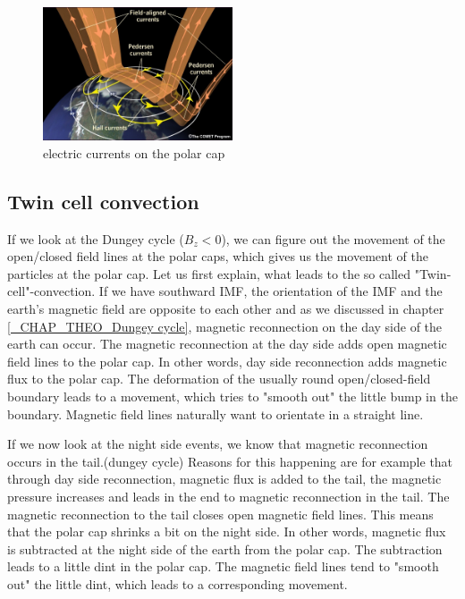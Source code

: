 \documentclass[10pt,a4paper]{article}
\begin{document}
\begin{figure}[h]
\centering
\includegraphics[width=0.5\textwidth]{polar_electric_currents.jpg}
\caption{electric currents on the polar cap\cite{Link1}}
\label{electric currents on the polar cap}
\end{figure}

\subsection{Twin cell convection \label{_CHAP_THEO_twin cell convection}}
If we look at the Dungey cycle ($B_z<0$), we can figure out the movement of the open/closed field lines at the polar caps, which gives us the movement of the particles at 
the polar cap. Let us first explain, what leads to the so called "Twin-cell"-convection. If we have southward IMF, the orientation of the IMF and the earth's magnetic 
field are opposite to each other and as we discussed in chapter \ref{_CHAP_THEO_Dungey cycle}, magnetic reconnection on the day side of the earth can occur. 
The magnetic reconnection at the day side adds open magnetic field lines to the polar cap. In other words, day side reconnection adds magnetic flux to the polar cap. 
The deformation of the usually round open/closed-field boundary leads to a movement, which tries to "smooth out" the little bump in the boundary. 
Magnetic field lines naturally want to orientate in a straight line. 

If we now look at the night side events, we know that magnetic reconnection occurs in the tail.(dungey cycle) Reasons for this happening 
are for example that through day side reconnection, magnetic flux is added to the tail, the magnetic pressure increases and leads in the end to magnetic reconnection 
in the tail. The magnetic reconnection to the tail closes open magnetic field lines. This means that the polar cap shrinks a bit on the night side. 
In other words, magnetic flux is subtracted at the night side of the earth from the polar cap. The subtraction leads to a little dint in the polar cap. 
The magnetic field lines tend to "smooth out" the little dint, which leads to a corresponding movement. 
\end{document}
